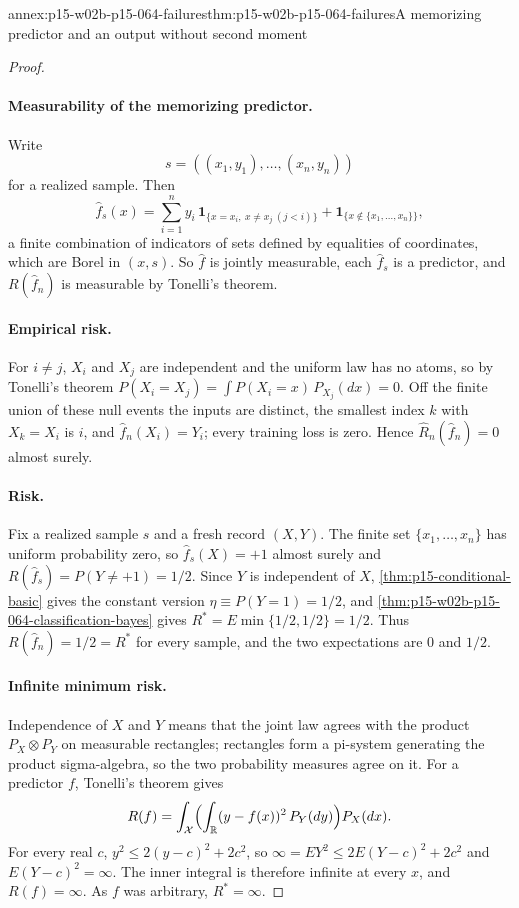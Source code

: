 \begin{annexitem}{annex:p15-w02b-p15-064-failures}{thm:p15-w02b-p15-064-failures}{A memorizing predictor and an output without second moment}
\begin{proof}
\paragraph{Measurability of the memorizing predictor.}
Write
\[
 s=((x_1,y_1),\ldots,(x_n,y_n))
\]
for a realized sample. Then
\[
 \widehat f_s(x)=\sum_{i=1}^ny_i\,\mathbf1_{\{x=x_i,\ x\neq x_j\ (j<i)\}}
 +\mathbf1_{\{x\notin\{x_1,\ldots,x_n\}\}},
\]
a finite combination of indicators of sets defined by equalities of
coordinates, which are Borel in \((x,s)\). So \(\widehat f\) is jointly
measurable, each \(\widehat f_s\) is a predictor, and \(R(\widehat f_n)\) is
measurable by Tonelli's theorem.

\paragraph{Empirical risk.}
For \(i\neq j\), \(X_i\) and \(X_j\) are independent and the uniform law has
no atoms, so by Tonelli's theorem
\(P(X_i=X_j)=\int P(X_i=x)\,P_{X_j}(dx)=0\). Off the finite union of these
null events the inputs are distinct, the smallest index \(k\) with
\(X_k=X_i\) is \(i\), and \(\widehat f_n(X_i)=Y_i\); every training loss is
zero. Hence \(\widehat R_n(\widehat f_n)=0\) almost surely.

\paragraph{Risk.}
Fix a realized sample \(s\) and a fresh record \((X,Y)\). The finite set
\(\{x_1,\ldots,x_n\}\) has uniform probability zero, so
\(\widehat f_s(X)=+1\) almost surely and
\(R(\widehat f_s)=P(Y\neq+1)=1/2\). Since \(Y\) is independent of \(X\),
\cref{thm:p15-conditional-basic} gives the constant version
\(\eta\equiv P(Y=1)=1/2\), and
\cref{thm:p15-w02b-p15-064-classification-bayes} gives
\(R^{*}=E\min\{1/2,1/2\}=1/2\). Thus \(R(\widehat f_n)=1/2=R^{*}\) for every
sample, and the two expectations are \(0\) and \(1/2\).

\paragraph{Infinite minimum risk.}
Independence of \(X\) and \(Y\) means that the joint law agrees with the
product \(P_X\otimes P_Y\) on measurable rectangles; rectangles form a
pi-system generating the product sigma-algebra, so the two probability
measures agree on it. For a predictor \(f\), Tonelli's theorem gives
\[
 R(f)=\int_{\mathcal X}\Bigl(\int_{\mathbb R}(y-f(x))^2\,P_Y(dy)\Bigr)P_X(dx).
\]
For every real \(c\), \(y^2\leq2(y-c)^2+2c^2\), so
\(\infty=EY^2\leq2E(Y-c)^2+2c^2\) and \(E(Y-c)^2=\infty\). The inner integral
is therefore infinite at every \(x\), and \(R(f)=\infty\). As \(f\) was
arbitrary, \(R^{*}=\infty\).
\end{proof}
\end{annexitem}
